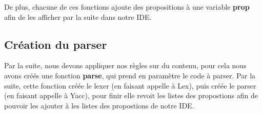 \documentclass[a4paper,12pt]{article}
\begin{document}
		De plus, chacune de ces fonctions ajoute des propositions à une variable \textbf{prop} afin de les afficher par la suite dans notre IDE.

	\subsection{Création du parser}

		Par la suite, nous devons appliquer nos règles sur du contenu, pour cela nous avons créés une fonction \textbf{parse}, qui prend en paramètre le code à parser. Par la suite, cette fonction créée le lexer (en faisant appelle à Lex), puis créée le parser (en faisant appelle à Yacc), pour finir elle revoit les listes des propostions afin de pouvoir les ajouter à les listes des propostions de notre IDE.
\end{document}
